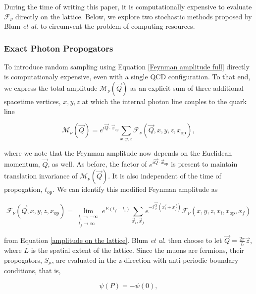 \documentclass{article}
\numberwithin{equation}{section} %
\begin{document}
During the time of writing this paper\cite{blum}, it is computationally expensive to evaluate $\mathcal{F}_\nu$ directly on the lattice. Below, we explore two stochastic methods proposed by Blum \textit{et al.} to circumvent the problem of computing resources.

\subsubsection{Exact Photon Propogators}

To introduce random sampling using Equation \ref{Feynman amplitude full} directly is computationaly expensive, even with a single QCD configuration. To that end, we express the total amplitude $\mathcal{M}_\nu(\vec{Q})$ as an explicit sum of three additional spacetime vertices, $x,y,z$ at which the internal photon line couples to the quark line 

\begin{equation}
\mathcal{M}_\nu(\vec{Q}) = e^{i\vec{Q}\cdot\vec{x}_\mathrm{op}} \sum_{x,y,z} \mathcal{F}_\nu(\vec{Q},x,y,z,x_\mathrm{op}),
\label{total amplitude with spacetime}
\end{equation}

\noindent where we note that the Feynman amplitude now depends on the Euclidean momentum, $\vec{Q}$, as well. As before, the factor of $e^{i\vec{Q}\cdot\vec{x}_\mathrm{op}}$ is present to maintain translation invariance of $\mathcal{M}_\nu(\vec{Q})$. It is also independent of the time of propogation, $t_\mathrm{op}$. We can identify this modified Feynman amplitude as 

\begin{equation}
\mathcal{F}_\nu(\vec{Q},x,y,z,x_\mathrm{op}) = \lim_{\substack{t_i\rightarrow -\infty\\t_f \rightarrow \infty}} e^{E(t_f-t_i)} \sum_{\vec{x}_i,\vec{x}_f}e^{-i\frac{\vec{Q}}{2}(\vec{x_i}+\vec{x_f})} \mathcal{F}_\nu(x,y,z,x_i,x_\mathrm{op}, x_f)
\end{equation}

\noindent from Equation \ref{amplitude on the lattice}. Blum \textit{et al.} then choose to let $\vec{Q} = \frac{2\pi}{L}\vec{z}$, where $L$ is the spatial extent of the lattice. Since the muons are fermions, their propogators, $S_\mu$, are evaluated in the z-direction with anti-periodic boundary conditions, that is,

\begin{equation}
\psi(P) = -\psi(0),
\end{equation}
\end{document}
